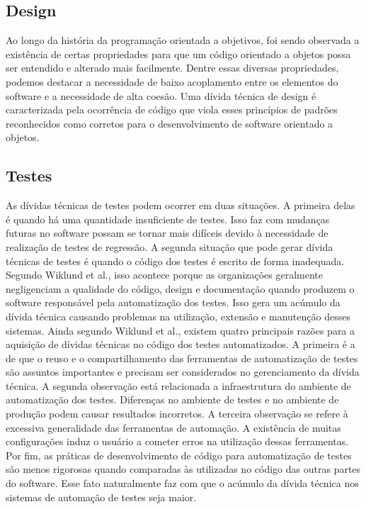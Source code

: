 \subsection{Design}
\label{tipo_td_design}

Ao longo da história da programação orientada a objetivos, foi sendo observada a existência de certas propriedades para que um código orientado a objetos possa ser entendido e alterado mais facilmente.  Dentre essas diversas propriedades, podemos destacar a necessidade de baixo acoplamento entre os elementos do software e a necessidade de alta coesão. Uma dívida técnica de design é caracterizada pela ocorrência de código que viola esses princípios de padrões reconhecidos como corretos para o desenvolvimento de software orientado a objetos.  


\subsection{Testes}


As dívidas técnicas de testes podem ocorrer em duas situações. A primeira delas é quando há uma quantidade insuficiente de testes. Isso faz com mudanças futuras no software possam se tornar mais difíceis devido à necessidade de realização de testes de regressão. A segunda situação que pode gerar dívida técnicas de testes é quando o código dos testes é escrito de forma inadequada. Segundo Wiklund et al.\cite{wiklund2012technical}, isso acontece porque as organizações geralmente negligenciam a qualidade do código, design e documentação quando produzem o software responsável pela automatização dos testes. Isso gera um acúmulo da dívida técnica causando problemas na utilização, extensão e manutenção desses sistemas.  Ainda segundo  Wiklund et al., existem quatro principais razões para a aquisição de dívidas técnicas no código dos testes automatizados. A primeira é a de que o reuso e o compartilhamento das ferramentas de automatização de testes são assuntos importantes e precisam ser considerados no gerenciamento da dívida técnica. A segunda observação está relacionada a infraestrutura do ambiente de automatização dos testes. Diferenças no ambiente de testes e no ambiente de produção podem causar resultados incorretos. A terceira observação se refere à excessiva generalidade das ferramentas de automação. A existência de muitas configurações induz o usuário a cometer erros na utilização dessas ferramentas. Por fim, as práticas de desenvolvimento de código para automatização de testes são menos rigorosas quando comparadas às utilizadas no código das outras partes do software. Esse fato naturalmente faz com que o acúmulo da dívida técnica nos sistemas de automação de testes seja maior. 

